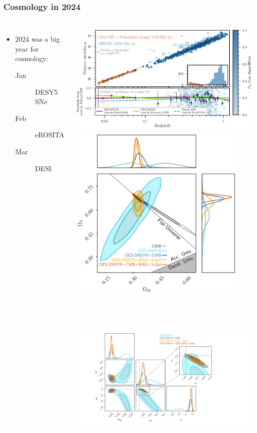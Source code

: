 \documentclass[aspectratio=169]{beamer}
\begin{document}
\begin{frame}
    \frametitle{Cosmology in 2024}
    \begin{columns}
        \begin{itemize}
            \item 2024 was a big year for cosmology:
                \begin{description}
                    \item[Jan] DESY5 SNe 
                    \item[Feb] eROSITA 
                    \item[Mar] DESI 
                \end{description}
        \end{itemize}
        \includegraphics[width=\textwidth]{figures/HD_5yr_KeyPaper.pdf}
        \includegraphics[height=0.42\textwidth]{figures/LCDM_paper.pdf}%
        \includegraphics[height=0.42\textwidth]{figures/w0wa_paper_wZoom.pdf}
    \end{columns}
\end{frame}
\end{document}
